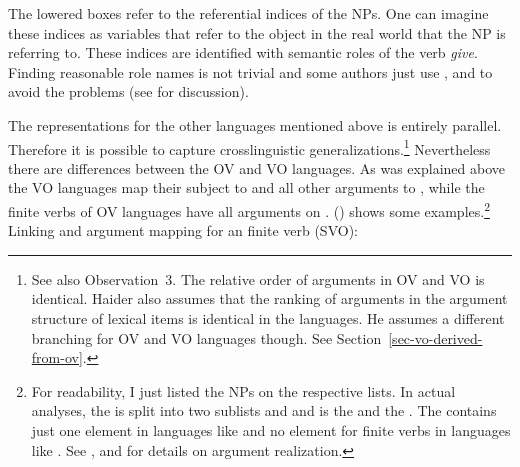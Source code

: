 \label{le-gives}
\z
The lowered boxes refer to the referential indices of the NPs. One can imagine these indices as
variables that refer to the object in the real world that the NP is referring to. These indices are
identified with semantic roles of the verb \emph{give}. Finding reasonable role names is not trivial
and some authors just use \argone, \argtwo and \argthree to avoid the problems (see \citealp{Dowty91a}
for discussion).

\largerpage%
The representations for the other languages mentioned above is entirely parallel. Therefore it is
possible to capture crosslinguistic generalizations.\footnote{
  See also  Observation~3. The relative order of arguments in OV
  and VO is identical. Haider also assumes that the ranking of arguments in the argument structure
  of lexical items is identical in the  languages. He assumes a different branching for OV
  and VO languages though. See Section~\ref{sec-vo-derived-from-ov}.
} Nevertheless there are differences between the
 OV and VO languages. As was explained above the VO languages map their subject to \spr and
all other arguments to \comps, while the finite verbs of OV languages have all arguments on \comps. 
() shows some examples.\footnote{%
 For readability, I just listed the NPs on the respective lists. In
actual analyses, the \argstl is split into two sublists  and  and  is the
\sprl and  the \compsl. The \sprl contains just one element in languages like  and no
element for finite verbs in languages like .
  See ,  and  for details on argument realization.
}
\eal
\ex Linking and argument mapping for an  finite verb (SVO):\\

